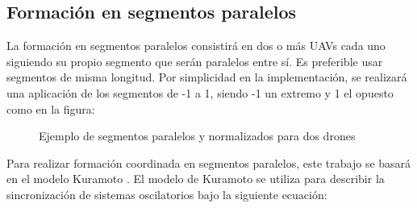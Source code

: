 \subsection{Formación en segmentos paralelos}

La formación en segmentos paralelos consistirá en dos o más UAVs 
cada uno siguiendo su propio segmento que serán paralelos entre sí.
Es preferible usar segmentos de misma longitud.
Por simplicidad en la implementación, 
se realizará una aplicación de los segmentos de -1 a 1, 
siendo -1 un extremo y 1 el opuesto como en la figura:

\begin{figure}[!h]
    \centering
    \caption{Ejemplo de segmentos paralelos y normalizados para dos drones}
    \label{fig:parallel-segments-formation}
\end{figure}

Para realizar formación coordinada en segmentos paralelos, este trabajo
se basará en el modelo Kuramoto \cite{kuramoto-model}.
El modelo de Kuramoto se utiliza para describir la sincronización de sistemas oscilatorios 
bajo la siguiente ecuación:

